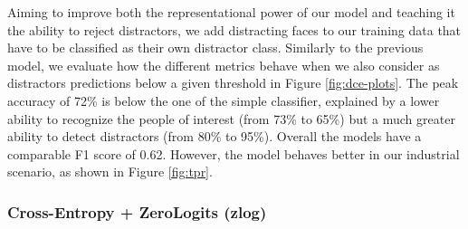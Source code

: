 Aiming to improve both the representational power of our model and teaching it the ability to reject distractors, we add distracting faces to our training data that have to be classified as their own distractor class. Similarly to the previous model, we evaluate how the different metrics behave when we also consider as distractors predictions below a given threshold in Figure \ref{fig:dce-plots}. The peak accuracy of 72\% is below the one of the simple classifier, explained by a lower ability to recognize the people of interest (from 73\% to 65\%) but a much greater ability to detect distractors (from 80\% to 95\%). Overall the models have a comparable F1 score of 0.62. However, the model behaves better in our industrial scenario, as shown in Figure \ref{fig:tpr}.

\subsubsection{Cross-Entropy + ZeroLogits (zlog)}

